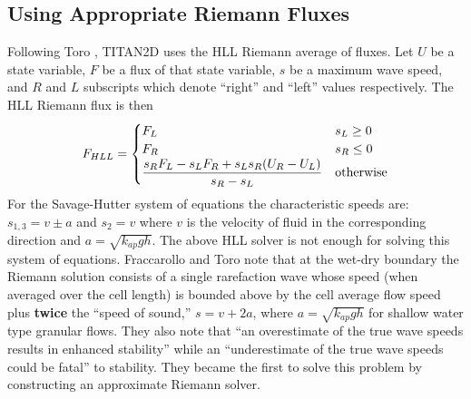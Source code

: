 \documentclass[review]{elsarticle}
\begin{document}
\subsection{Using Appropriate Riemann Fluxes} \label{Riemann}
Following Toro \cite{ToroBook2001}, TITAN2D uses 
the HLL Riemann average of fluxes. Let $U$ be a state variable, $F$ 
be a flux of that state variable, $s$ be a maximum wave speed, 
and $R$ and $L$ subscripts which denote ``right'' and ``left'' values 
respectively. The HLL Riemann flux is then
\begin{equation}
        F_{HLL}=\begin{cases}
                F_L & s_L\ge 0\\
                F_R & s_R\le 0\\
                \dfrac{s_RF_L-s_LF_R+s_Ls_R(U_R-U_L)}{s_R-s_L} & \textnormal{otherwise}
        \end{cases}
\end{equation}
For the Savage-Hutter system of equations the characteristic speeds are: $s_{1,3}=v\pm a$ and $s_2=v$ where $v$ is the 
velocity of fluid in the corresponding direction and $a=\sqrt{k_{ap}gh}$.
The above HLL solver is not enough for solving this system of equations.
Fraccarollo and Toro \cite{FraccarolloToro1995} note that at the 
wet-dry boundary the Riemann solution consists of a single rarefaction 
wave whose speed (when averaged over the cell length) 
is bounded above by the cell average flow speed plus 
{\bf twice} the ``speed of sound,'' $s=v+2a$, where $a=\sqrt{k_{ap}gh}$ 
for shallow water type granular flows.  They also note that ``an overestimate 
of the true wave speeds results in enhanced stability'' while an 
``underestimate of the true wave speeds could be fatal'' to stability.
They became the first to 
solve this problem by constructing an approximate Riemann solver.
\end{document}
